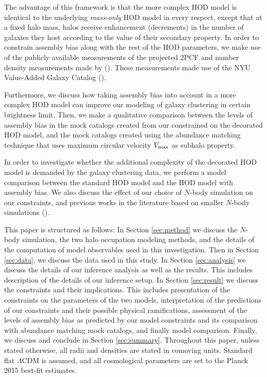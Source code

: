 The advantage of this framework is that the more complex HOD model is identical to the underlying \emph{mass-only} HOD model in every respect, except that at a fixed halo mass, halos receive enhancement (decrements) in the number of galaxies they host according to the value of their secondary property. In order to constrain assembly bias along with the rest of the HOD parameters, we make use of the publicly available measurements of the projected 2PCF and number density measurements made by   
(\citealt{guo2015}). These measurements made use of the NYU Value-Added Galaxy Catalog (\citealt{Blanton2005}).

Furthermore, we discuss how taking assembly bias into account in a more complex HOD model can improve our modeling of galaxy clustering in certain brightness limit. Then, we make a qualitative comparison between the levels of assembly bias in the mock catalogs created from our constrained on the decorated HOD model, and the \citet{hw2013} mock catalogs created using the abundance matching technique that uses maximum circular velocity $V_{\rm max}$ as subhalo property.

In order to investigate whether the additional complexity of the decorated HOD model is demanded by the galaxy clustering data, we perform a model comparison between the standard HOD model and the HOD model with assembly bias. We also discuss the effect of our choice of $N$-body simulation on our constraints, and previous works in the literature based on smaller $N$-body simulations (\citealt{zentner2016}).

This paper is structured as follows: In Section \ref{sec:method} we discuss the $N$-body simulation, the two halo occupation modeling methods, and the details of the computation of model observables used in this investigation. Then in Section \ref{sec:data}, we discuss the data used in this study. 
In Section \ref{sec:analysis} we discuss the details of our inference analysis as well as the results. This includes description of the details of our inference setup. In Section \ref{sec:result} we discuss the constraints and their implications. This includes presentation of the constraints on the parameters of the two models, interpretation of the predictions of our constraints and their possible physical ramifications, assessment of the levels of assembly bias as predicted by our model constraints and its comparison with abundance matching mock catalogs, and finally model comparison. Finally, we discuss and conclude in Section \ref{sec:summary}.
Throughout this paper, unless stated otherwise, 
all radii and densities are stated in comoving units. 
Standard flat $\Lambda$CDM is assumed, and all cosmological 
parameters are set to the Planck 2015 best-fit estimates.

